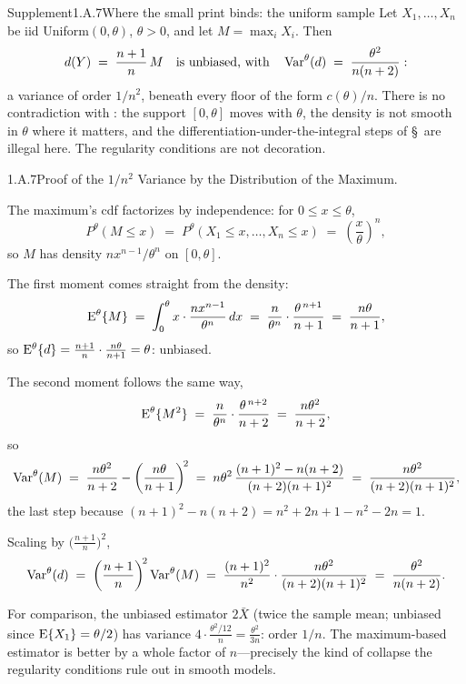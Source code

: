 \documentclass[main.tex]{subfiles}
\begin{document}
\begin{ObjL}{Supplement}{1.A.7}{Where the small print binds: the uniform sample}
Let $X_1,\dots,X_n$ be iid Uniform$(0,\theta)$, $\theta>0$, and let $M=\max_i X_i$. Then
\[ d(Y) \;=\; \frac{n+1}{n}\,M \quad\text{is unbiased, with}\quad
   \operatorname{Var}^{\theta}(d) \;=\; \frac{\theta^2}{n(n+2)} : \]
a variance of order $1/n^2$, beneath every floor of the form $c(\theta)/n$. There is no
contradiction with : the support $[0,\theta]$ moves with $\theta$, the density
is not smooth in $\theta$ where it matters, and the differentiation-under-the-integral steps
of \S\, are illegal here. The regularity conditions are not decoration.
\end{ObjL}
\begin{Prf}{1.A.7}{Proof of the $1/n^2$ Variance by the Distribution of the Maximum.}{}
\item The maximum's cdf factorizes by independence: for $0\le x\le\theta$,
      \[ P^{\theta}(M\le x) \;=\; P^{\theta}(X_1\le x,\dots,X_n\le x)
         \;=\; \left(\frac{x}{\theta}\right)^{\!n} , \]
      so $M$ has density $n x^{n-1}/\theta^n$ on $[0,\theta]$.
\item The first moment comes straight from the density:
      \[ \mathrm{E}^{\theta}\{M\} \;=\; \int_0^{\theta} x\cdot\frac{n x^{n-1}}{\theta^n}\,dx
         \;=\; \frac{n}{\theta^n}\cdot\frac{\theta^{\,n+1}}{n+1}
         \;=\; \frac{n\theta}{n+1} , \]
      so $\mathrm{E}^{\theta}\{d\}=\frac{n+1}{n}\cdot\frac{n\theta}{n+1}=\theta$: unbiased.
\item The second moment follows the same way,
      \[ \mathrm{E}^{\theta}\{M^2\} \;=\; \frac{n}{\theta^n}\cdot\frac{\theta^{\,n+2}}{n+2}
         \;=\; \frac{n\theta^2}{n+2} , \]
      so
      \[ \operatorname{Var}^{\theta}(M) \;=\; \frac{n\theta^2}{n+2}-\left(\frac{n\theta}{n+1}\right)^{\!2}
         \;=\; n\theta^2\,\frac{(n+1)^2-n(n+2)}{(n+2)(n+1)^2}
         \;=\; \frac{n\theta^2}{(n+2)(n+1)^2} , \]
      the last step because $(n+1)^2-n(n+2)=n^2+2n+1-n^2-2n=1$.
\item Scaling by $\big(\tfrac{n+1}{n}\big)^2$,
      \[ \operatorname{Var}^{\theta}(d) \;=\; \left(\frac{n+1}{n}\right)^{\!2}\operatorname{Var}^{\theta}(M)
         \;=\; \frac{(n+1)^2}{n^2}\cdot\frac{n\theta^2}{(n+2)(n+1)^2}
         \;=\; \frac{\theta^2}{n(n+2)} . \]
\item For comparison, the unbiased estimator $2\bar X$ (twice the sample mean; unbiased since
      $\mathrm{E}\{X_1\}=\theta/2$) has variance $4\cdot\frac{\theta^2/12}{n}=\frac{\theta^2}{3n}$:
      order $1/n$. The maximum-based estimator is better by a whole factor of $n$---precisely
      the kind of collapse the regularity conditions rule out in smooth models.
\end{Prf}

\ifSubfilesClassLoaded{\clearpage\objindex}{}
\end{document}
